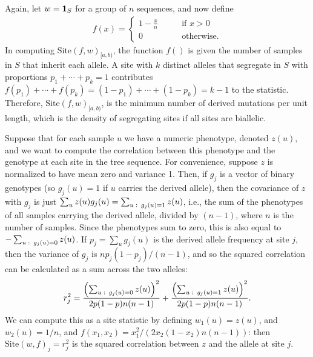 \documentclass{article}
\newcommand{\site}{\mbox{Site}} %
\newcommand{\iw}{w} %
\begin{document}
\begin{example} \label{ex:segregating_sites}
    Again, let $\iw = \bone_{S}$ for a group of $n$ sequences,
    and now define
    \begin{align*}
        f(x) = \begin{cases}
            1 - \frac{x}{n} \qquad &\text{if } x > 0 \\
            0 \qquad &\text{otherwise} .
        \end{cases}
    \end{align*}
    In computing $\site(f, \iw)_{[a,b)}$, the function $f()$ is given the number of samples in $S$
    that inherit each allele.
    A site with $k$ distinct alleles that segregate in $S$ with proportions $p_1 + \cdots + p_k = 1$
    contributes $f(p_1) + \cdots + f(p_k) = (1 - p_1) + \cdots + (1 - p_k) = k - 1$ to the statistic.
    Therefore, $\site(f, \iw)_{[a,b)}$, is the minimum number of derived mutations per unit length,
    which is the density of segregating sites if all sites are biallelic.
\end{example}

\begin{example} \label{ex:site_correlations}
    Suppose that for each sample $u$ we have a numeric phenotype, denoted $z(u)$,
    and we want to compute the correlation between this phenotype
    and the genotype at each site in the tree sequence.
    For convenience, suppose $z$ is normalized
    to have mean zero and variance 1.
    Then, if $g_j$ is a vector of binary genotypes (so $g_j(u) = 1$ if $u$ carries the derived allele),
    then the covariance of $z$ with $g_j$ is just $\sum_u z(u) g_j(u) = \sum_{u \,\colon\, g_j(u) = 1} z(u)$,
    i.e., the sum of the phenotypes of all samples carrying the derived allele,
    divided by $(n - 1)$, where $n$ is the number of samples.
    Since the phenotypes sum to zero, this is also equal to
    $- \sum_{u \,\colon\, g_j(u) = 0} z(u)$.
    If $p_j = \sum_u g_j(u)$ is the derived allele frequency at site $j$,
    then the variance of $g_j$ is $n p_j (1-p_j) / (n-1)$,
    and so the squared correlation can be calculated as a sum across the two alleles:
    \begin{align*}
        r_j^2 =
        \frac{\left( \sum_{u \,\colon\, g_j(u) = 0} z(u)\right)^2}{2p(1-p)n(n-1)}
        + \frac{\left( \sum_{u \,\colon\, g_j(u) = 1} z(u)\right)^2}{2p(1-p)n(n-1)}  .
    \end{align*}
    We can compute this as a site statistic by defining $\iw_{1}(u) = z(u)$, and $\iw_{2}(u) = 1/n$,
    and $f(x_1, x_2) = x_1^2 / (2 x_2 (1 - x_2) n (n-1))$:
    then $\site(\iw, f)_j = r_j^2$ is the squared correlation between $z$ and the allele at site $j$.
\end{example}
\end{document}
